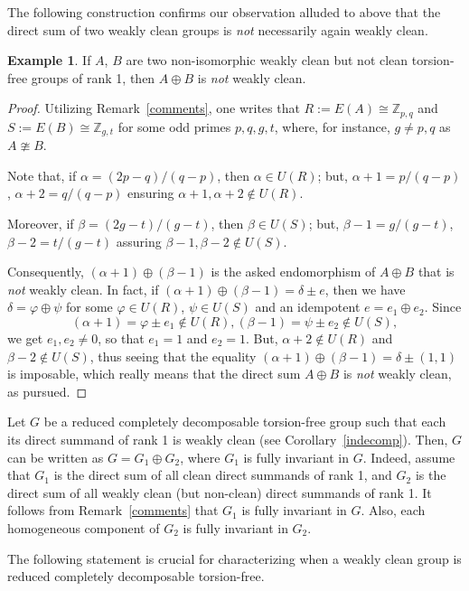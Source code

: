 \documentclass{amsart}
\theoremstyle{definition}
\newtheorem{example}[theorem]{Example}
\theoremstyle{remark}
\numberwithin{equation}{section}
\begin{document}
The following construction confirms our observation alluded to above that the direct sum of two weakly clean groups is {\it not} necessarily again weakly clean.

\begin{example}\label{twonon}
If $A$, $B$ are two non-isomorphic weakly clean but not clean torsion-free groups of rank 1, then $A\oplus B$ is {\it not} weakly clean.
\end{example}

\begin{proof}
Utilizing Remark~\ref{comments}, one writes that $R:=E(A)\cong\mathbb{Z}_{p,q}$ and $S:=E(B)\cong\mathbb{Z}_{g,t}$
for some odd primes $p,q,g,t$, where, for instance, $g\neq p,q$ as $A\ncong B$.

Note that, if $\alpha=(2p-q)/(q-p)$, then $\alpha\in U(R)$; but, $\alpha+1=p/(q-p)$, $\alpha+2=q/(q-p)$ ensuring $\alpha+1,\alpha+2\not\in U(R)$.

Moreover, if $\beta=(2g-t)/(g-t)$, then $\beta\in U(S)$; but, $\beta-1=g/(g-t)$, $\beta-2=t/(g-t)$ assuring $\beta-1,\beta-2\not\in U(S)$.

Consequently, $(\alpha+1)\oplus(\beta-1)$ is the asked endomorphism of $A\oplus B$ that is {\it not} weakly clean. In fact, if $(\alpha+1)\oplus(\beta-1)=\delta\pm e$, then we have $\delta=\varphi\oplus\psi$ for some $\varphi\in U(R)$,
$\psi\in U(S)$ and an idempotent $e=e_1\oplus e_2$. Since $$(\alpha+1)=\varphi\pm e_1\not\in U(R), (\beta-1)=\psi\pm e_2\not\in U(S),$$ we get $e_1, e_2\neq 0$, so that $e_1=1$ and $e_2=1$. But, $\alpha+2\not\in U(R)$ and $\beta-2\not\in U(S)$, thus seeing that the equality $(\alpha+1)\oplus(\beta-1)=\delta\pm (1,1)$ is imposable, which really means that the direct sum $A\oplus B$ is {\it not} weakly clean, as pursued.
\end{proof}

Let $G$ be a reduced completely decomposable torsion-free group such that each its direct summand of rank 1 is weakly clean (see Corollary~\ref{indecomp}). Then, $G$ can be written as $G=G_1\oplus G_2$, where $G_1$ is fully invariant in $G$. Indeed, assume that $G_1$ is the direct sum of all clean direct summands of rank 1, and $G_2$ is the direct sum of all weakly clean (but non-clean) direct summands of rank 1. It follows from Remark~\ref{comments} that $G_1$ is fully invariant in $G$. Also, each homogeneous component of $G_2$ is fully invariant in $G_2$.

\medskip

The following statement is crucial for characterizing when a weakly clean group is reduced completely decomposable torsion-free.
\end{document}
